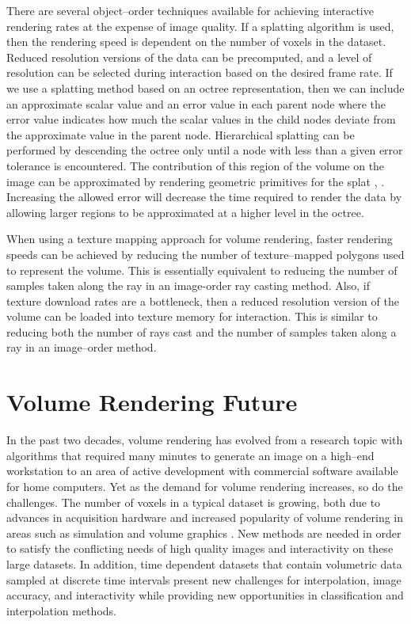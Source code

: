 There are several object--order techniques available for achieving interactive rendering rates at the expense of image quality. If a splatting algorithm is used, then the rendering speed is dependent on the number of voxels in the dataset. Reduced resolution versions of the data can be precomputed, and a level of resolution can be selected during interaction based on the desired frame rate. If we use a splatting method based on an octree representation, then we can include an approximate scalar value and an error value in each parent node where the error value indicates how much the scalar values in the child nodes deviate from the approximate value in the parent node. Hierarchical splatting \cite{Laur91} can be performed by descending the octree only until a node with less than a given error tolerance is encountered. The contribution of this region of the volume on the image can be approximated by rendering geometric primitives for the splat \cite{Shirley90}, \cite{Wilhelms91}. Increasing the allowed error will decrease the time required to render the data by allowing larger regions to be approximated at a higher level in the octree.

When using a texture mapping approach for volume rendering, faster rendering speeds can be achieved by reducing the number of texture--mapped polygons used to represent the volume. This is essentially equivalent to reducing the number of samples taken along the ray in an image-order ray casting method. Also, if texture download rates are a bottleneck, then a reduced resolution version of the volume can be loaded into texture memory for interaction. This is similar to reducing both the number of rays cast and the number of samples taken along a ray in an image--order method.

\section{Volume Rendering Future}

In the past two decades, volume rendering has evolved from a research topic with algorithms that required many minutes to generate an image on a high--end workstation to an area of active development with commercial software available for home computers. Yet as the demand for volume rendering increases, so do the challenges. The number of voxels in a typical dataset is growing, both due to advances in acquisition hardware and increased popularity of volume rendering in areas such as simulation and volume graphics \cite{Kaufman93}. New methods are needed in order to satisfy the conflicting needs of high quality images and interactivity on these large datasets. In addition, time dependent datasets that contain volumetric data sampled at discrete time intervals present new challenges for interpolation, image accuracy, and interactivity while providing new opportunities in classification and interpolation methods.

